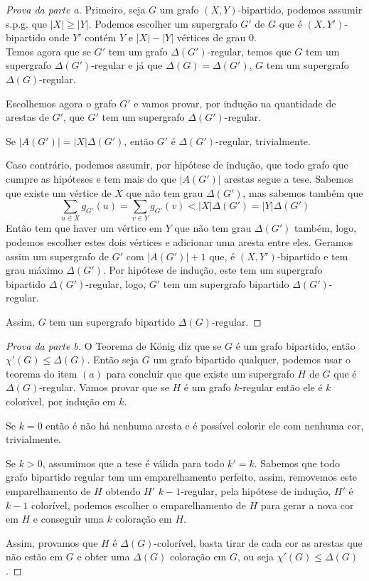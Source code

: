 \documentclass[12pt]{article}
\begin{document}
\begin{proof}[Prova da parte a]
Primeiro, seja $G$ um grafo $(X,Y)$-bipartido, podemos assumir s.p.g. que $|X| \geq |Y|$. Podemos escolher um supergrafo $G'$ de $G$ que é $(X,Y')$-bipartido onde $Y'$ contém $Y$ e $|X|-|Y|$ vértices de grau 0. \\
Temos agora que se $G'$ tem um grafo $\Delta(G')$-regular, temos que $G$ tem um supergrafo $\Delta(G')$-regular e já que $\Delta(G) = \Delta(G')$, $G$ tem um supergrafo $\Delta(G)$-regular.

Escolhemos agora o grafo $G'$ e vamos provar, por indução na quantidade de arestas de $G'$, que $G'$ tem um supergrafo $\Delta(G')$-regular. 

Se $|A(G')| = |X|\Delta(G')$, então $G'$ é $\Delta(G')$-regular, trivialmente.

Caso contrário, podemos assumir, por hipótese de indução, que todo grafo que cumpre as hipóteses e tem mais do que $|A(G')|$ arestas segue a tese. Sabemos que existe um vértice de $X$ que não tem grau $\Delta(G')$, mas sabemos também que
$$ \sum\limits_{u \in X} g_{G'}(u) = \sum\limits_{v \in Y} g_{G'}(v) < |X|\Delta(G') = |Y|\Delta(G') $$
Então tem que haver um vértice em $Y$ que não tem grau $\Delta(G')$ também, logo, podemos escolher estes dois vértices e adicionar uma aresta entre eles. Geramos assim um supergrafo de $G'$ com $|A(G')|+1$ que, é $(X,Y')$-bipartido e tem grau máximo $\Delta(G')$. Por hipótese de indução, este tem um supergrafo bipartido $\Delta(G')$-regular, logo, $G'$ tem um supergrafo bipartido $\Delta(G')$-regular.

Assim, $G$ tem um supergrafo bipartido $\Delta(G)$-regular.
\end{proof}

\begin{proof}[Prova da parte b]
O Teorema de König diz que se $G$ é um grafo bipartido, então $\chi'(G) \leq \Delta(G)$. Então seja $G$ um grafo bipartido qualquer, podemos usar o teorema do item $(a)$ para concluir que que existe um supergrafo $H$ de $G$ que é $\Delta(G)$-regular. Vamos provar que se $H$ é um grafo $k$-regular então ele é $k$ colorível, por indução em $k$.

Se $k = 0$ então é não há nenhuma aresta e é possível colorir ele com nenhuma cor, trivialmente. 

Se $k > 0$, assumimos que a tese é válida para todo $k' = k$. Sabemos que todo grafo bipartido regular tem um emparelhamento perfeito, assim, removemos este emparelhamento de $H$ obtendo $H'$ $k-1$-regular, pela hipótese de indução, $H'$ é $k-1$ colorível, podemos escolher o emparelhamento de $H$ para gerar a nova cor em $H$ e conseguir uma $k$ coloração em $H$.

Assim, provamos que $H$ é $\Delta(G)$-colorível, basta tirar de cada cor as arestas que não estão em $G$ e obter uma $\Delta(G)$ coloração em $G$, ou seja $\chi'(G) \leq \Delta(G)$.
\end{proof}
\end{document}
